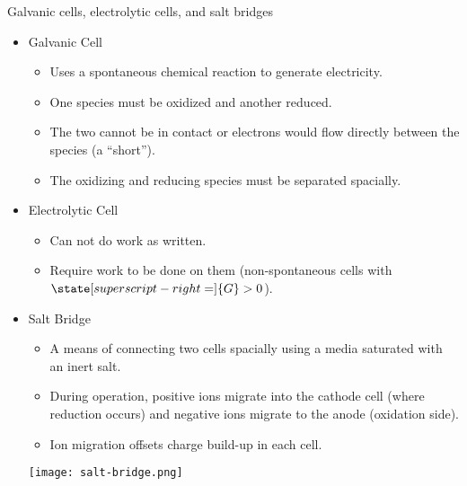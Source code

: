 \documentclass[notes=only]{beamer}
\begin{document}
\clearpage

\begin{frame}[allowframebreaks]{Galvanic cells, electrolytic cells, and salt
	bridges}
	\begin{itemize}
		\item Galvanic Cell
			\begin{itemize}
				\item Uses a spontaneous chemical reaction to
					generate electricity.
				\item \alert{One} species must be oxidized and
					\alert{another} reduced.
				\item The two cannot be in contact or electrons
					would flow directly between the species
					(a ``short'').
				\item The oxidizing and reducing species must be
					separated spacially.
			\end{itemize}
		\item Electrolytic Cell
			\begin{itemize}
				\item Can not do work as written.
				\item Require work to be done on them
					(non-spontaneous cells with
					$\state[superscript-right=]{G} > 0$).
			\end{itemize}

			\framebreak

		\item Salt Bridge
			\begin{itemize}
				\item A means of connecting two cells spacially
					using a media saturated with an inert
					salt.
				\item During operation, positive ions migrate
					into the \alert{cathode} cell (where
					reduction occurs) and negative ions
					migrate to the \alert{anode} (oxidation
					side).
				\item Ion migration offsets charge build-up in
					each cell.
			\end{itemize}
			\begin{center}
				\texttt{[image: salt-bridge.png]}
			\end{center}
	\end{itemize}
\end{frame}

\end{document}
